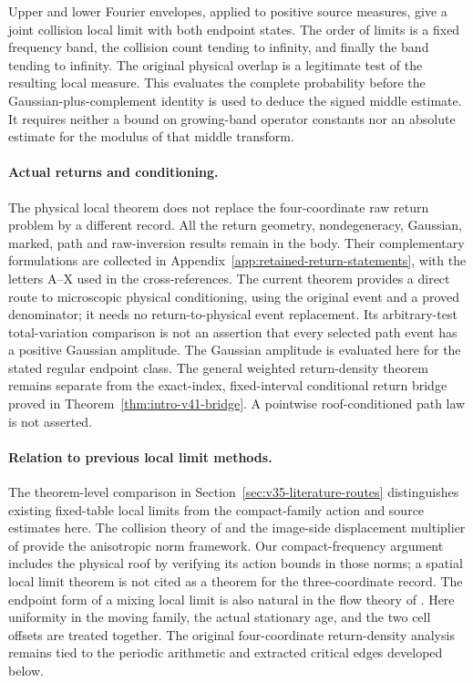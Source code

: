 Upper and lower Fourier envelopes, applied to positive source measures,
give a joint collision local limit with both endpoint states. The order of limits is a fixed
frequency band, the collision count tending to infinity, and finally
the band tending to infinity. The original physical overlap is a
legitimate test of the resulting local measure. This evaluates the
complete probability before the Gaussian-plus-complement identity is
used to deduce the signed middle estimate. It requires neither a bound
on growing-band operator constants nor an absolute estimate for the
modulus of that middle transform.

\paragraph{Actual returns and conditioning.}
The physical local theorem does not replace the four-coordinate raw
return problem by a different record. All the return geometry,
nondegeneracy, Gaussian, marked, path and raw-inversion results remain
in the body. Their complementary formulations are collected in
Appendix~\ref{app:retained-return-statements}, with the letters A--X
used in the cross-references. The current theorem provides a direct
route to microscopic physical conditioning, using the original event
and a proved denominator; it needs no return-to-physical event
replacement. Its arbitrary-test total-variation comparison is not an
assertion that every selected path event has a positive Gaussian
amplitude. The Gaussian amplitude is evaluated here for the stated
regular endpoint class. The general weighted return-density theorem
remains separate from the exact-index, fixed-interval conditional
return bridge proved in Theorem~\ref{thm:intro-v41-bridge}. A pointwise
roof-conditioned path law is not asserted.

\paragraph{Relation to previous local limit methods.}
The theorem-level comparison in Section~\ref{sec:v35-literature-routes} distinguishes existing fixed-table local limits from the compact-family action and source estimates here. The collision theory of \cite{DZ11,DZ} and the image-side displacement
multiplier of \cite{DPZ} provide the anisotropic norm framework.
Our compact-frequency argument includes the physical roof by verifying
its action bounds in those norms; a spatial local limit theorem is not
cited as a theorem for the three-coordinate record. The endpoint form
of a mixing local limit is also natural in the flow theory of
\cite{DN}. Here uniformity in the moving family, the actual stationary
age, and the two cell offsets are treated together. The original
four-coordinate return-density analysis remains tied to the periodic
arithmetic and extracted critical edges developed below.

